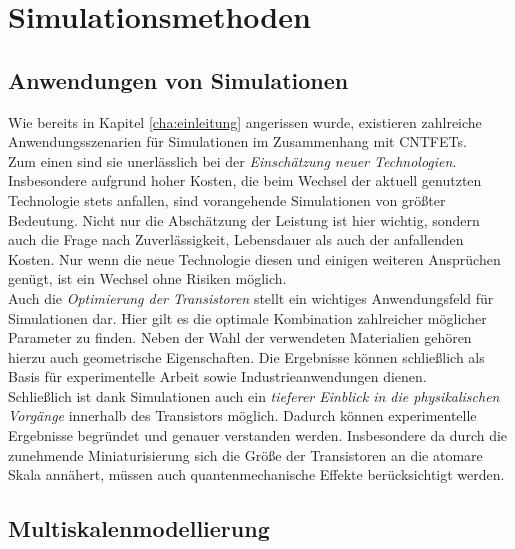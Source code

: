 \chapter{Simulationsmethoden}
\label{cha:simulationsmethoden}

\section{Anwendungen von Simulationen}
\label{anwendungenvonsimulationen}

Wie bereits in Kapitel \ref{cha:einleitung} angerissen wurde, existieren zahlreiche Anwendungsszenarien für Simulationen im Zusammenhang mit CNTFETs.\\
Zum einen sind sie unerlässlich bei der \textit{Einschätzung neuer Technologien}. Insbesondere aufgrund hoher Kosten, die beim Wechsel der aktuell genutzten Technologie stets anfallen, sind vorangehende Simulationen von größter Bedeutung. Nicht nur die Abschätzung der Leistung ist hier wichtig, sondern auch die Frage nach Zuverlässigkeit, Lebensdauer als auch der anfallenden Kosten. Nur wenn die neue Technologie diesen und einigen weiteren Ansprüchen genügt, ist ein Wechsel ohne Risiken möglich.\\
Auch die \textit{Optimierung der Transistoren} stellt ein wichtiges Anwendungsfeld für Simulationen dar.
Hier gilt es die optimale Kombination zahlreicher möglicher Parameter zu finden.
Neben der Wahl der verwendeten Materialien gehören hierzu auch geometrische Eigenschaften.
Die Ergebnisse können schließlich als Basis für experimentelle Arbeit sowie Industrieanwendungen dienen.\\
Schließlich ist dank Simulationen auch ein \textit{tieferer Einblick in die physikalischen Vorgänge} innerhalb des Transistors möglich.
Dadurch können experimentelle Ergebnisse begründet und genauer verstanden werden.
Insbesondere da durch die zunehmende Miniaturisierung sich die Größe der Transistoren an die atomare Skala annähert, müssen auch quantenmechanische Effekte berücksichtigt werden.
\\

\section{Multiskalenmodellierung}
\label{multiskalenmodellierung}

